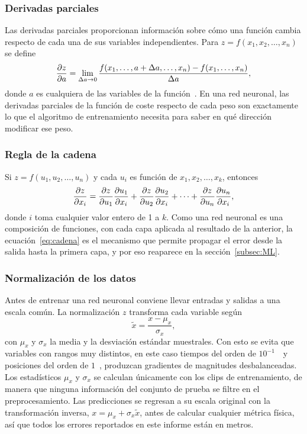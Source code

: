 \documentclass[titlepage,11pt]{article}
\begin{document}
\subsubsection{Derivadas parciales}
Las derivadas parciales proporcionan información sobre cómo una función cambia
respecto de cada una de sus variables independientes. Para
$z=f(x_1,x_2,\ldots,x_n)$ se define
\begin{equation}
  \pdv{z}{a}=\lim_{\Delta a\to0}
  \frac{f(x_1,\ldots,a+\Delta a,\ldots,x_n)-f(x_1,\ldots,x_n)}{\Delta a},
\end{equation}
donde $a$ es cualquiera de las variables de la función~\cite{zill_1985_clculo}.
En una red neuronal, las derivadas parciales de la función de coste respecto de
cada peso son exactamente lo que el algoritmo de entrenamiento necesita para
saber en qué dirección modificar ese peso.

\subsubsection{Regla de la cadena}
Si $z=f(u_1,u_2,\ldots,u_n)$ y cada $u_i$ es función de $x_1,x_2,\ldots,x_k$,
entonces~\cite{zill_1985_clculo}
\begin{equation}
  \pdv{z}{x_i}=\pdv{z}{u_1}\pdv{u_1}{x_i}+\pdv{z}{u_2}\pdv{u_2}{x_i}
  +\cdots+\pdv{z}{u_n}\pdv{u_n}{x_i},
  \label{eq:cadena}
\end{equation}
donde $i$ toma cualquier valor entero de 1 a $k$. Como una red neuronal es una
composición de funciones, con cada capa aplicada al resultado de la anterior,
la ecuación~\eqref{eq:cadena} es el mecanismo que permite propagar el error
desde la salida hasta la primera capa, y por eso reaparece en la
sección~\ref{subsec:ML}.

\subsubsection{Normalización de los datos}
\label{subsubsec:zscore}
Antes de entrenar una red neuronal conviene llevar entradas y salidas a una escala común. La
normalización $z$ transforma cada variable según
\begin{equation}
  \tilde x = \frac{x-\mu_x}{\sigma_x},
  \label{eq:zscore}
\end{equation}
con $\mu_x$ y $\sigma_x$ la media y la desviación estándar muestrales. Con esto
se evita que variables con rangos muy distintos, en este caso tiempos del orden
de $10^{-1}$~\second\ y posiciones del orden de $1$~\meter, produzcan
gradientes de magnitudes desbalanceadas. Los estadísticos $\mu_x$ y $\sigma_x$
se calculan únicamente con los clips de entrenamiento, de manera que ninguna
información del conjunto de prueba se filtre en el preprocesamiento. Las
predicciones se regresan a su escala original con la transformación inversa,
$x=\mu_x+\sigma_x\tilde x$, antes de calcular
cualquier métrica física, así que todos los errores reportados en este informe
están en metros.
\end{document}
